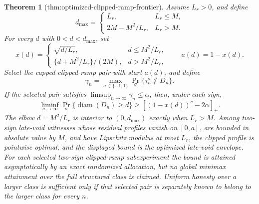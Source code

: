\documentclass{article}
\newtheorem{theorem}{Theorem}
\begin{document}
\begin{theorem}[thm:optimized-clipped-ramp-frontier]\label{thm:optimized-clipped-ramp-frontier}
Assume \(L_r>0\), and define
\[
 d_{\max}=\begin{cases}
 L_r,&L_r\le M,\\
 2M-M^2/L_r,&L_r>M.
 \end{cases}
\]
For every \(d\) with \(0<d<d_{\max}\), set
\[
 x(d)=\begin{cases}
 \sqrt{d/L_r},&d\le M^2/L_r,\\
 \{d+M^2/L_r\}/(2M),&d>M^2/L_r,
 \end{cases}
 \qquad a(d)=1-x(d).
\]
Select the capped clipped-ramp pair with start \(a(d)\), and define
\[
 \gamma_n=\max_{\sigma\in\{-1,1\}}
 \Pr_\sigma\{\tau_n^\sigma\notin D_n\}.
\]
If the selected pair satisfies \(\limsup_{n\to\infty}\gamma_n\le\alpha\), then, under each sign,
\[
 \liminf_{n\to\infty}
 \Pr_\sigma\{\operatorname{diam}(D_n)\ge d\}
 \ge[(1-x(d))^c-2\alpha]_+.
\]
The elbow \(d=M^2/L_r\) is interior to \((0,d_{\max})\) exactly when \(L_r>M\). Among two-sign late-void witnesses whose residual profiles vanish on \([0,a]\), are bounded in absolute value by \(M\), and have Lipschitz modulus at most \(L_r\), the clipped profile is pointwise optimal, and the displayed bound is the optimized late-void envelope. For each selected two-sign clipped-ramp subexperiment the bound is attained asymptotically by an exact randomized allocation, but no global minimax attainment over the full structured class is claimed. Uniform honesty over a larger class is sufficient only if that selected pair is separately known to belong to the larger class for every \(n\).
\end{theorem}
\end{document}
